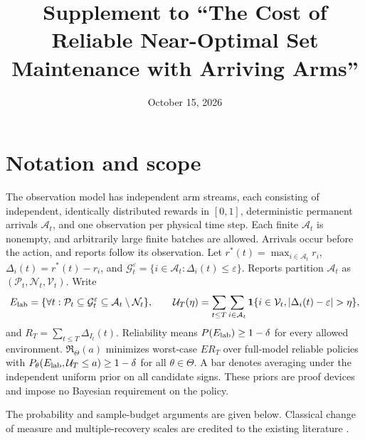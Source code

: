 \documentclass[11pt]{article}
\title{Supplement to ``The Cost of Reliable Near-Optimal Set Maintenance with Arriving Arms''}
\author{}
\date{October 15, 2026}
\begin{document}
\maketitle
\section*{Notation and scope}
The observation model has independent arm streams, each consisting of
independent, identically distributed rewards in $[0,1]$, deterministic
permanent arrivals $\mathcal A_t$, and one observation per physical time step.
Each finite $\mathcal A_t$ is nonempty, and arbitrarily large finite batches
are allowed. Arrivals occur before the action, and reports follow its
observation. Let $r^*(t)=\max_{i\in\mathcal A_t}r_i$,
$\Delta_i(t)=r^*(t)-r_i$, and
$\mathcal G_t^\varepsilon=\{i\in\mathcal A_t:\Delta_i(t)\le\varepsilon\}$.
Reports partition $\mathcal A_t$ as
$(\mathcal P_t,\mathcal N_t,\mathcal V_t)$. Write
\[
 E_{\rm lab}=\{\forall t:\mathcal P_t\subseteq\mathcal G_t^\varepsilon
                      \subseteq\mathcal A_t\setminus\mathcal N_t\},\qquad
 \mathcal U_T(\eta)=\sum_{t\le T}\sum_{i\in\mathcal A_t}
 \ind\{i\in\mathcal V_t,|\Delta_i(t)-\varepsilon|>\eta\},
\]
and $R_T=\sum_{t\le T}\Delta_{I_t}(t)$. Reliability means
$P(E_{\rm lab})\ge1-\delta$ for every allowed environment.
$\mathfrak R_\Theta(a)$ minimizes worst-case $ER_T$ over full-model reliable
policies with $P_\theta(E_{\rm lab},\mathcal U_T\le a)\ge1-\delta$ for all
$\theta\in\Theta$. A bar denotes averaging under the independent uniform
prior on all candidate signs. These priors are proof devices and impose no
Bayesian requirement on the policy.

The probability and sample-budget arguments are given below. Classical
change of measure and multiple-recovery scales are credited to the existing
literature \citep{kaufmann2016,malloy2014,jamieson2018,mason2020}.
















\FloatBarrier


\end{document}
